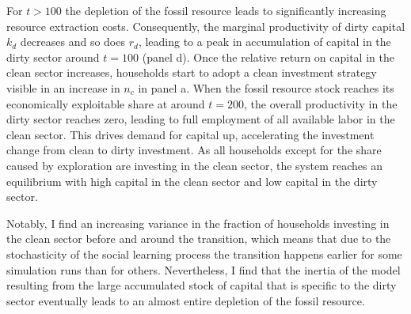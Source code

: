 For $t>100$ the depletion of the fossil resource leads to significantly increasing resource extraction costs. Consequently, the marginal productivity of dirty capital $k_d$ decreases and so does $r_d$, leading to a peak in accumulation of capital in the dirty sector around $t=100$ (panel d).
Once the relative return on capital in the clean sector increases, households start to adopt a clean investment strategy visible in an increase in $n_c$ in panel a.
When the fossil resource stock reaches its economically exploitable share at around $t=200$, the overall productivity in the dirty sector reaches zero, leading to full employment of all available labor in the clean sector.
This drives demand for capital up, accelerating the investment change from clean to dirty investment.
As all households except for the share caused by exploration are investing in the clean sector, the system reaches an equilibrium with high capital in the clean sector and low capital in the dirty sector.

Notably, I find an increasing variance in the fraction of households investing in the clean sector before and around the transition, which means that due to the stochasticity of the social learning process the transition happens earlier for some simulation runs than for others. Nevertheless, I find that the inertia of the model resulting from the large accumulated stock of capital that is specific to the dirty sector eventually leads to an almost entire depletion of the fossil resource.

